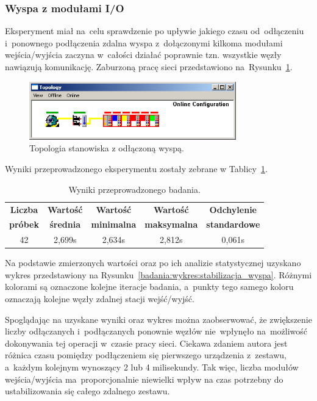 \subsubsection{Wyspa z modułami I/O}
Eksperyment miał na~celu sprawdzenie po upływie jakiego czasu od~odłączeniu i~ponownego podłączenia zdalna wyspa z~dołączonymi kilkoma modułami wejścia/wyjścia zaczyna w~całości działać poprawnie tzn. wszystkie węzły nawiązują komunikację. Zaburzoną pracę sieci przedstawiono na~Rysunku~\ref{coupler}.
\begin{figure}[!htb] 	\centering 	\includegraphics[width=0.8\textwidth]{images/topologyCPerror} \caption{Topologia stanowiska z odłączoną wyspą.} \label{coupler} \end{figure}

Wyniki przeprowadzonego eksperymentu zostały zebrane w Tablicy~\ref{badania:wyniki:stabilizacja_wyspa}.
\begin{table}[!htb]
\begin{center}
\begin{tabular}{| c | c | c | c | c |}\hline
\textbf{Liczba} & \textbf{Wartość} & \textbf{Wartość} & \textbf{Wartość} & \textbf{Odchylenie} \\
\textbf{próbek} & \textbf{średnia} & \textbf{minimalna} & \textbf{maksymalna} & \textbf{standardowe} \\\hline\hline
42 & 2,699s & 2,634s & 2,812s & 0,061s \\\hline
\end{tabular}
\end{center}
\vspace*{-6mm}
  \caption{Wyniki przeprowadzonego badania.}
	\label{badania:wyniki:stabilizacja_wyspa}
\end{table}

Na podstawie zmierzonych wartości oraz po ich analizie statystycznej uzyskano wykres przedstawiony na Rysunku~\ref{badania:wykres:stabilizacja_wyspa}. Różnymi kolorami są oznaczone kolejne iteracje badania, a~punkty tego samego koloru oznaczają kolejne węzły zdalnej stacji wejść/wyjść.


Spoglądając na uzyskane wyniki oraz wykres można zaobserwować, że zwiększenie liczby odłączanych i~podłączanych ponownie węzłów nie~wpłynęło na~możliwość dokonywania tej operacji w~czasie pracy sieci. Ciekawa zdaniem autora jest różnica czasu pomiędzy podłączeniem się pierwszego urządzenia z~zestawu, a~każdym kolejnym wynoszący 2 lub 4 milisekundy. Tak więc, liczba modułów wejścia/wyjścia ma~proporcjonalnie niewielki wpływ na czas potrzebny do ustabilizowania się całego zdalnego zestawu.

